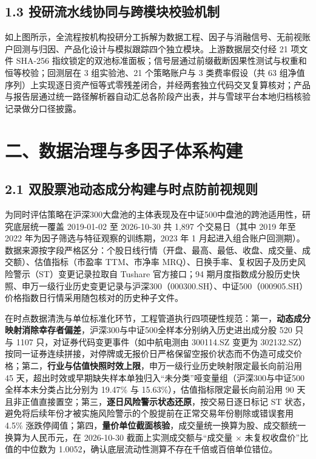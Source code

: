 \documentclass[12pt,a4paper]{article}
\let\origsection\section
\renewcommand{\section}[1]{\needspace{6.5\baselineskip}\origsection{#1}}
\let\origsubsection\subsection
\renewcommand{\subsection}[1]{\needspace{4\baselineskip}\origsubsection{#1}}
\begin{document}
\subsection{1.3 投研流水线协同与跨模块校验机制}

如上图所示，全流程按机构投研分工拆解为数据工程、因子与消融信号、无前视账户回测与归因、产品化设计与模拟跟踪四个独立模块。上游数据层交付经 21 项文件 SHA-256 指纹锁定的双池标准面板；信号层通过前缀截断因果性测试与权重和恒等校验；回测层在 3 组实验池、21 个策略账户与 3 类费率假设（共 63 组净值序列）上实现逐日资产恒等式零残差闭合，并经两套独立代码交叉复算核对；产品与报告层通过统一路径解析器自动汇总各阶段产出表，并与雪球平台本地归档核验记录做分口径披露。

\section{二、数据治理与多因子体系构建}

\subsection{2.1 双股票池动态成分构建与时点防前视规则}

为同时评估策略在沪深300大盘池的主体表现及在中证500中盘池的跨池适用性，研究底层统一覆盖 2019-01-02 至 2026-10-30 共 1,897 个交易日（其中 2019 年至 2022 年为因子筛选与特征观察的训练期，2023 年 1 月起进入组合账户回测期）。数据来源按字段严格区分：个股日线行情（开盘、最高、最低、收盘、成交量、成交额）、估值指标（市盈率 TTM、市净率 MRQ）、日换手率、复权因子及历史风险警示（ST）变更记录拉取自 Tushare 官方接口；94 期月度指数成分股历史快照、申万一级行业历史变更记录与沪深300（000300.SH）、中证500（000905.SH）价格指数日行情采用随包核对的历史种子文件。

在时点数据清洗与单位标准化环节，工程管道执行四项硬性规范：第一，\textbf{动态成分映射消除幸存者偏差}，沪深300与中证500全样本分别纳入历史进出成分股 520 只与 1107 只，对证券代码变更事件（如中航电测由 300114.SZ 变更为 302132.SZ）按同一证券连续拼接，对停牌或无报价日严格保留空报价状态而不伪造可成交价格；第二，\textbf{行业与估值快照时效上限}，申万一级行业历史映射限定最长向前沿用 45 天，超出时效或早期缺失样本单独归入“未分类”哑变量组（沪深300与中证500全样本未分类占比分别为 19.47\% 与 15.63\%），估值指标限定最长向前沿用 90 天且非正值直接置空；第三，\textbf{逐日风险警示状态还原}，按交易日逐日标记 ST 状态，避免将后续年份才被实施风险警示的个股提前在正常交易年份剔除或错误套用 4.5\% 涨跌停阈值；第四，\textbf{量价单位截面核验}，成交量统一换算为股、成交额统一换算为人民币元，在 2026-10-30 截面上实测成交额与“成交量 $\times$ 未复权收盘价”比值的中位数为 1.0052，确认底层流动性测算不存在千倍或百倍单位错位。
\end{document}
